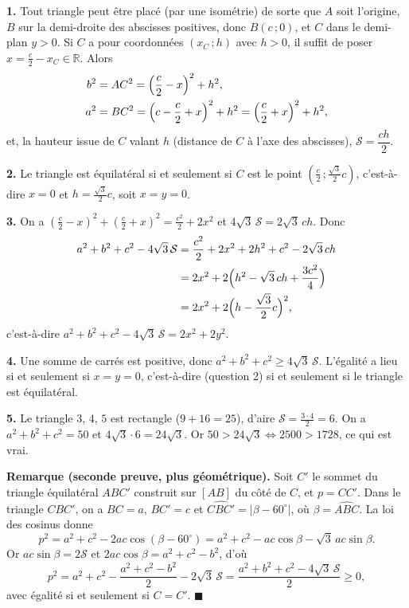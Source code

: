\textbf{1.} Tout triangle peut être placé (par une isométrie) de sorte que
$A$ soit l'origine, $B$ sur la demi-droite des abscisses positives, donc
$B(c\,;0)$, et $C$ dans le demi-plan $y > 0$. Si $C$ a pour coordonnées
$(x_C\,;h)$ avec $h > 0$, il suffit de poser $x = \frac{c}{2} - x_C \in \mathbb{R}$.
Alors
\[
\begin{aligned}
b^2 &= AC^2 = \Bigl(\frac{c}{2} - x\Bigr)^2 + h^2, \\
a^2 &= BC^2 = \Bigl(c - \frac{c}{2} + x\Bigr)^2 + h^2 = \Bigl(\frac{c}{2} + x\Bigr)^2 + h^2,
\end{aligned}
\]
et, la hauteur issue de $C$ valant $h$ (distance de $C$ à l'axe des
abscisses), $\mathcal{S} = \dfrac{ch}{2}$.

\textbf{2.} Le triangle est équilatéral si et seulement si $C$ est le point
$\left(\frac{c}{2}\,;\frac{\sqrt3}{2}c\right)$, c'est-à-dire $x = 0$ et
$h = \frac{\sqrt3}{2}c$, soit $x = y = 0$.

\textbf{3.} On a $\left(\frac{c}{2} - x\right)^2 + \left(\frac{c}{2} + x\right)^2
= \frac{c^2}{2} + 2x^2$ et $4\sqrt3\,\mathcal{S} = 2\sqrt3\,ch$. Donc
\[
\begin{aligned}
a^2 + b^2 + c^2 - 4\sqrt3\,\mathcal{S}
&= \frac{c^2}{2} + 2x^2 + 2h^2 + c^2 - 2\sqrt3\,ch \\
&= 2x^2 + 2\Bigl(h^2 - \sqrt3\,ch + \frac{3c^2}{4}\Bigr) \\
&= 2x^2 + 2\Bigl(h - \frac{\sqrt3}{2}c\Bigr)^2 ,
\end{aligned}
\]
c'est-à-dire $a^2 + b^2 + c^2 - 4\sqrt3\,\mathcal{S} = 2x^2 + 2y^2$.

\textbf{4.} Une somme de carrés est positive, donc
$a^2 + b^2 + c^2 \geqslant 4\sqrt3\,\mathcal{S}$. L'égalité a lieu si et
seulement si $x = y = 0$, c'est-à-dire (question 2) si et seulement si le
triangle est équilatéral.

\textbf{5.} Le triangle $3$, $4$, $5$ est rectangle ($9 + 16 = 25$), d'aire
$\mathcal{S} = \frac{3 \cdot 4}{2} = 6$. On a $a^2 + b^2 + c^2 = 50$ et
$4\sqrt3 \cdot 6 = 24\sqrt3$. Or $50 > 24\sqrt3 \iff 2500 > 1728$, ce qui est
vrai.

\medskip
\textbf{Remarque (seconde preuve, plus géométrique).}
Soit $C'$ le sommet du triangle équilatéral $ABC'$ construit sur $[AB]$ du
côté de $C$, et $p = CC'$. Dans le triangle $CBC'$, on a $BC = a$, $BC' = c$
et $\widehat{CBC'} = |\beta - 60^\circ|$, où $\beta = \widehat{ABC}$. La loi
des cosinus donne
\[
p^2 = a^2 + c^2 - 2ac\cos(\beta - 60^\circ)
= a^2 + c^2 - ac\cos\beta - \sqrt3\,ac\sin\beta .
\]
Or $ac\sin\beta = 2\mathcal{S}$ et $2ac\cos\beta = a^2 + c^2 - b^2$, d'où
\[
p^2 = a^2 + c^2 - \frac{a^2 + c^2 - b^2}{2} - 2\sqrt3\,\mathcal{S}
= \frac{a^2 + b^2 + c^2 - 4\sqrt3\,\mathcal{S}}{2} \geqslant 0,
\]
avec égalité si et seulement si $C = C'$. \hfill $\blacksquare$
